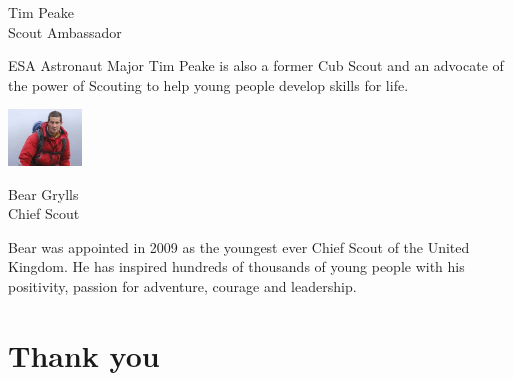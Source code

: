\begin{frame}
\begin{minipage}[t]{0.95\textwidth}
\begin{multicols}{4}
\par
\vspace{1.4mm}
\linespread{1.2}\selectfont Tim Peake\\Scout Ambassador
\par
\vspace{1.2\baselineskip}
\begin{minipage}[t]{\columnwidth}
\linespread{1.4}\selectfont
\raggedright
ESA Astronaut Major Tim
Peake is also a former Cub
Scout and an advocate of the
power of Scouting to help
young people develop skills
for life.
\end{minipage}
\vfill
\columnbreak
\includegraphics[height=1.5cm]{media/image12}
\par
\vspace{1.4mm}
\linespread{1.2}\selectfont Bear Grylls\\Chief Scout
\par
\vspace{1.2\baselineskip}
\begin{minipage}[t]{\columnwidth}
\linespread{1.4}\selectfont
\raggedright
Bear was appointed in 2009
as the youngest ever Chief
Scout of the United Kingdom.
He has inspired hundreds of
thousands of young people
with his positivity, passion for
adventure, courage and
leadership.
\end{minipage}
\vfill
\end{multicols}
\end{minipage}
\hfill
\end{frame}

\section{Thank you}